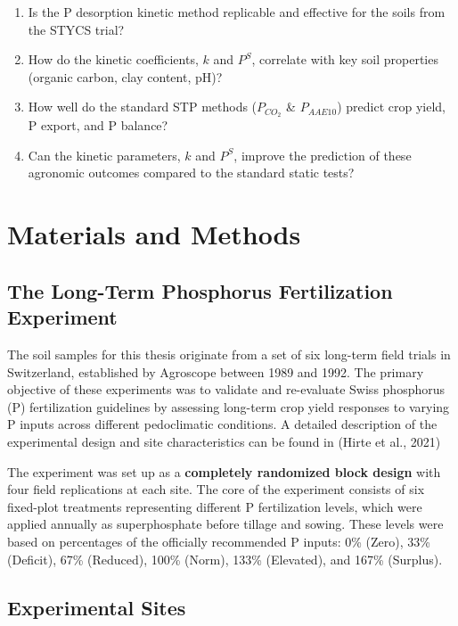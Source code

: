 \documentclass[
  a4paper,
]{article}
\providecommand{\tightlist}{%
  \setlength{\itemsep}{0pt}\setlength{\parskip}{0pt}}
\begin{document}
\begin{enumerate}
\def\labelenumi{\arabic{enumi}.}
\tightlist
\item
  Is the P desorption kinetic method replicable and effective for the
  soils from the STYCS trial?
\item
  How do the kinetic coefficients, \(k\) and \(P^S\), correlate with key
  soil properties (organic carbon, clay content, pH)?
\item
  How well do the standard STP methods (\(P_{CO_2}\) \& \(P_{AAE10}\))
  predict crop yield, P export, and P balance?
\item
  Can the kinetic parameters, \(k\) and \(P^S\), improve the prediction
  of these agronomic outcomes compared to the standard static tests?
\end{enumerate}

\section{Materials and Methods}\label{sec-materials-and-methods}

\subsection{The Long-Term Phosphorus Fertilization
Experiment}\label{sec-the-long-term-phosphorus-fertilization-experiment}

The soil samples for this thesis originate from a set of six long-term
field trials in Switzerland, established by Agroscope between 1989 and
1992. The primary objective of these experiments was to validate and
re-evaluate Swiss phosphorus (P) fertilization guidelines by assessing
long-term crop yield responses to varying P inputs across different
pedoclimatic conditions. A detailed description of the experimental
design and site characteristics can be found in (Hirte et al., 2021)

The experiment was set up as a \textbf{completely randomized block
design} with four field replications at each site. The core of the
experiment consists of six fixed-plot treatments representing different
P fertilization levels, which were applied annually as superphosphate
before tillage and sowing. These levels were based on percentages of the
officially recommended P inputs: 0\% (Zero), 33\% (Deficit), 67\%
(Reduced), 100\% (Norm), 133\% (Elevated), and 167\% (Surplus).

\subsection{Experimental Sites}\label{sec-experimental-sites}
\end{document}
